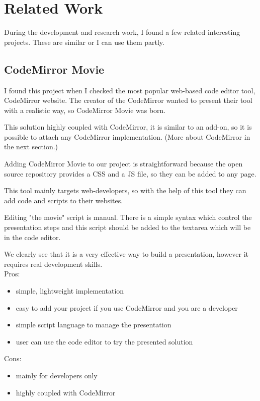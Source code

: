 \documentclass[12pt, a4paper, oneside, openright, medskipamount]{report}
\begin{document}
\chapter{Related Work}

During the development and research work, I found a few related interesting projects. These are similar or I can use them partly.

\section{CodeMirror Movie}

I found this project when I checked the most popular web-based code editor tool, CodeMirror website. The creator of the CodeMirror wanted to present their tool with a realistic way, so CodeMirror Movie was born. \cite{cm-movie}

This solution highly coupled with CodeMirror, it is similar to an add-on, so it is possible to attach any CodeMirror implementation. (More about CodeMirror in the next section.)

Adding CodeMirror Movie to our project is straightforward because the open source repository provides a CSS and a JS file, so they can be added to any page.

This tool mainly targets web-developers, so with the help of this tool they can add code and scripts to their websites.

Editing "the movie" script is manual. There is a simple syntax which control the presentation steps and this script should be added to the textarea which will be in the code editor.

We clearly see that it is a very effective way to build a presentation, however it requires real development skills.\\

\noindent Pros:
\begin{itemize}[noitemsep]
\item simple, lightweight implementation
\item easy to add your project if you use CodeMirror and you are a developer
\item simple script language to manage the presentation
\item user can use the code editor to try the presented solution
\end{itemize}
Cons:
\begin{itemize}[noitemsep]
\item mainly for developers only
\item highly coupled with CodeMirror
\end{itemize}
\end{document}
